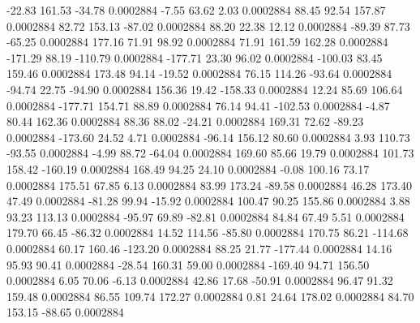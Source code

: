       -22.83      161.53      -34.78     0.0002884
       -7.55       63.62        2.03     0.0002884
       88.45       92.54      157.87     0.0002884
       82.72      153.13      -87.02     0.0002884
       88.20       22.38       12.12     0.0002884
      -89.39       87.73      -65.25     0.0002884
      177.16       71.91       98.92     0.0002884
       71.91      161.59      162.28     0.0002884
     -171.29       88.19     -110.79     0.0002884
     -177.71       23.30       96.02     0.0002884
     -100.03       83.45      159.46     0.0002884
      173.48       94.14      -19.52     0.0002884
       76.15      114.26      -93.64     0.0002884
      -94.74       22.75      -94.90     0.0002884
      156.36       19.42     -158.33     0.0002884
       12.24       85.69      106.64     0.0002884
     -177.71      154.71       88.89     0.0002884
       76.14       94.41     -102.53     0.0002884
       -4.87       80.44      162.36     0.0002884
       88.36       88.02      -24.21     0.0002884
      169.31       72.62      -89.23     0.0002884
     -173.60       24.52        4.71     0.0002884
      -96.14      156.12       80.60     0.0002884
        3.93      110.73      -93.55     0.0002884
       -4.99       88.72      -64.04     0.0002884
      169.60       85.66       19.79     0.0002884
      101.73      158.42     -160.19     0.0002884
      168.49       94.25       24.10     0.0002884
       -0.08      100.16       73.17     0.0002884
      175.51       67.85        6.13     0.0002884
       83.99      173.24      -89.58     0.0002884
       46.28      173.40       47.49     0.0002884
      -81.28       99.94      -15.92     0.0002884
      100.47       90.25      155.86     0.0002884
        3.88       93.23      113.13     0.0002884
      -95.97       69.89      -82.81     0.0002884
       84.84       67.49        5.51     0.0002884
      179.70       66.45      -86.32     0.0002884
       14.52      114.56      -85.80     0.0002884
      170.75       86.21     -114.68     0.0002884
       60.17      160.46     -123.20     0.0002884
       88.25       21.77     -177.44     0.0002884
       14.16       95.93       90.41     0.0002884
      -28.54      160.31       59.00     0.0002884
     -169.40       94.71      156.50     0.0002884
        6.05       70.06       -6.13     0.0002884
       42.86       17.68      -50.91     0.0002884
       96.47       91.32      159.48     0.0002884
       86.55      109.74      172.27     0.0002884
        0.81       24.64      178.02     0.0002884
       84.70      153.15      -88.65     0.0002884
